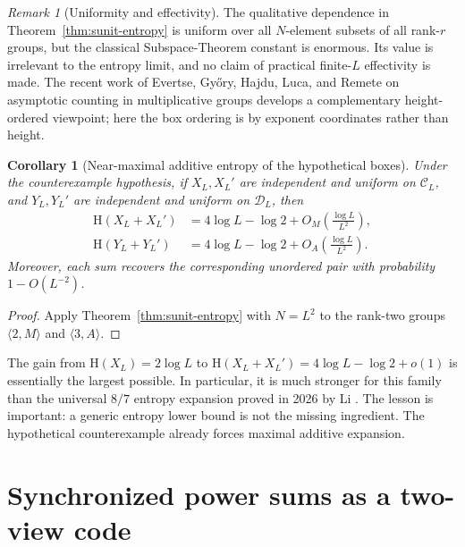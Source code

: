 \documentclass[11pt,oneside]{article}
\newtheorem{corollary}[theorem]{Corollary}
\theoremstyle{definition}
\theoremstyle{remark}
\newtheorem{remark}[theorem]{Remark}
\newcommand{\HH}{\mathrm{H}}
\begin{document}
\begin{remark}[Uniformity and effectivity]
The qualitative dependence in Theorem~\ref{thm:sunit-entropy} is uniform over all \(N\)-element subsets of all rank-\(r\) groups, but the classical Subspace-Theorem constant is enormous.  Its value is irrelevant to the entropy limit, and no claim of practical finite-\(L\) effectivity is made.  The recent work of Evertse, Gy\H{o}ry, Hajdu, Luca, and Remete on asymptotic counting in multiplicative groups \cite{EvertseEtAl2026} develops a complementary height-ordered viewpoint; here the box ordering is by exponent coordinates rather than height.
\end{remark}

\begin{corollary}[Near-maximal additive entropy of the hypothetical boxes]\label{cor:box-additive-entropy}
Under the counterexample hypothesis, if \(X_L,X_L'\) are independent and uniform on \(\mathcal C_L\), and \(Y_L,Y_L'\) are independent and uniform on \(\mathcal D_L\), then
\begin{align}
 \HH(X_L+X_L')&=4\log L-\log2
      +O_{M}\!\left(\frac{\log L}{L^2}\right),\label{eq:C-additive-entropy}\\
 \HH(Y_L+Y_L')&=4\log L-\log2
      +O_{A}\!\left(\frac{\log L}{L^2}\right).
      \label{eq:D-additive-entropy}
\end{align}
Moreover, each sum recovers the corresponding unordered pair with probability \(1-O(L^{-2})\).
\end{corollary}

\begin{proof}
Apply Theorem~\ref{thm:sunit-entropy} with \(N=L^2\) to the rank-two groups \(\langle2,M\rangle\) and \(\langle3,A\rangle\).
\end{proof}

The gain from \(\HH(X_L)=2\log L\) to \(\HH(X_L+X_L')=4\log L-\log2+o(1)\) is essentially the largest possible.  In particular, it is much stronger for this family than the universal \(8/7\) entropy expansion proved in 2026 by Li \cite{Li2026}.  The lesson is important: a generic entropy lower bound is not the missing ingredient.  The hypothetical counterexample already forces maximal additive expansion.

\section{Synchronized power sums as a two-view code}\label{sec:synchronized-sums}
\end{document}

